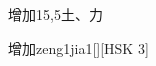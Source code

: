 \begin{entry}{增加}{15,5}{⼟、⼒}
  \begin{phonetics}{增加}{zeng1jia1}[][HSK 3]
  \end{phonetics}
\end{entry}
